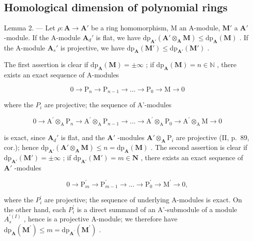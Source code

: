 \subsection{Homological dimension of polynomial rings}

Lemma 2. --- Let \(\rho: \mathbf{A} \to \mathbf{A}'\) be a ring homomorphism, M an A-module, \(\mathbf{M}'\) a \(\mathbf{A}'\) -module. If the A-module \(\mathbf{A}_d'\) is flat, we have \(\mathrm{dp}_{\mathbf{A}'}(\mathbf{A}' \otimes_{\mathbf{A}} \mathbf{M}) \leqslant \mathrm{dp}_{\mathbf{A}}(\mathbf{M})\) . If the A-module \(\mathbf{A}_s'\) is projective, we have \(\mathrm{dp}_{\mathbf{A}}(\mathbf{M}') \leqslant \mathrm{dp}_{\mathbf{A}'}(\mathbf{M}')\) .

The first assertion is clear if \(\mathrm{dp}_{\mathbf{A}}(\mathbf{M}) = \pm \infty\) ; if \(\mathrm{dp}_{\mathbf{A}}(\mathbf{M}) = n \in \mathbb{N}\) , there exists an exact sequence of A-modules

\[
0 \rightarrow \mathrm{P} _ {n} \rightarrow \mathrm{P} _ {n - 1} \rightarrow \dots \rightarrow \mathrm{P} _ {0} \rightarrow \mathrm{M} \rightarrow 0
\]

where the \(P_{i}\) are projective; the sequence of A'-modules

\[
0 \rightarrow \mathrm{A} ^ {\prime} \otimes_ {\mathrm{A}} \mathrm{P} _ {n} \rightarrow \mathrm{A} ^ {\prime} \otimes_ {\mathrm{A}} \mathrm{P} _ {n - 1} \rightarrow \dots \rightarrow \mathrm{A} ^ {\prime} \otimes_ {\mathrm{A}} \mathrm{P} _ {0} \rightarrow \mathrm{A} ^ {\prime} \otimes_ {\mathrm{A}} \mathrm{M} \rightarrow 0
\]

is exact, since \(\mathbf{A}_d'\) is flat, and the \(\mathbf{A}'\) -modules \(\mathbf{A}' \otimes_{\mathbf{A}} \mathrm{P}_i\) are projective (II, p.~89, cor.); hence \(\mathrm{dp}_{\mathbf{A}'}(\mathbf{A}' \otimes_{\mathbf{A}} \mathbf{M}) \leqslant n = \mathrm{dp}_{\mathbf{A}}(\mathbf{M})\) . The second assertion is clear if \(\mathrm{dp}_{\mathbf{A}'}(\mathbf{M}') = \pm \infty\) ; if \(\mathrm{dp}_{\mathbf{A}'}(\mathbf{M}') = m \in \mathbf{N}\) , there exists an exact sequence of \(\mathbf{A}'\) -modules

\[
0 \to \mathrm{P} _ {m} ^ {\prime} \to \mathrm{P} _ {m - 1} ^ {\prime} \to \dots \to \mathrm{P} _ {0} ^ {\prime} \to \mathrm{M} ^ {\prime} \to 0,
\]

where the \(P_{i}^{\prime}\) are projective; the sequence of underlying A-modules is exact. On the other hand, each \(P_{i}^{\prime}\) is a direct summand of an A'-submodule of a module \(A_{s}^{\prime(I)}\) , hence is a projective A-module; we therefore have \(\mathrm{dp}_{\mathbf{A}}(\mathbf{M}^{\prime}) \leqslant m = \mathrm{dp}_{\mathbf{A}^{\prime}}(\mathbf{M}^{\prime})\) .


